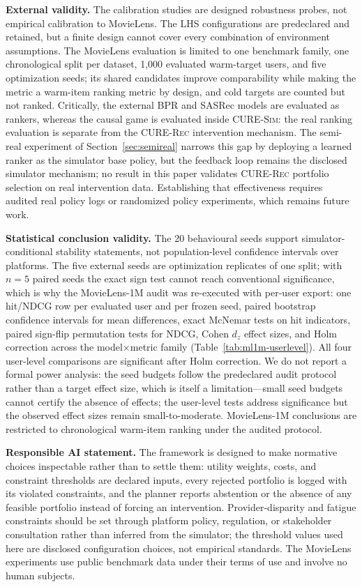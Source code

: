 \documentclass[pdflatex,sn-mathphys-num]{sn-jnl}
\theoremstyle{thmstyleone}
\theoremstyle{thmstyletwo}
\theoremstyle{thmstylethree}
\newcommand{\CURE}{\textsc{CURE-Rec}}
\newcommand{\Sim}{\textsc{CURE-Sim}}
\begin{document}
\textbf{External validity.} The calibration studies are designed robustness probes, not empirical calibration to MovieLens. The LHS configurations are predeclared and retained, but a finite design cannot cover every combination of environment assumptions. The MovieLens evaluation is limited to one benchmark family, one chronological split per dataset, 1,000 evaluated warm-target users, and five optimization seeds; its shared candidates improve comparability while making the metric a warm-item ranking metric by design, and cold targets are counted but not ranked. Critically, the external BPR and SASRec models are evaluated as rankers, whereas the causal game is evaluated inside \Sim{}: the real ranking evaluation is separate from the \CURE{} intervention mechanism. The semi-real experiment of Section~\ref{sec:semireal} narrows this gap by deploying a learned ranker as the simulator base policy, but the feedback loop remains the disclosed simulator mechanism; no result in this paper validates \CURE{} portfolio selection on real intervention data. Establishing that effectiveness requires audited real policy logs or randomized policy experiments, which remains future work.

\textbf{Statistical conclusion validity.} The 20 behavioural seeds support simulator-conditional stability statements, not population-level confidence intervals over platforms. The five external seeds are optimization replicates of one split; with $n=5$ paired seeds the exact sign test cannot reach conventional significance, which is why the MovieLens-1M audit was re-executed with per-user export: one hit/NDCG row per evaluated user and per frozen seed, paired bootstrap confidence intervals for mean differences, exact McNemar tests on hit indicators, paired sign-flip permutation tests for NDCG, Cohen $d_z$ effect sizes, and Holm correction across the model$\times$metric family (Table~\ref{tab:ml1m-userlevel}). All four user-level comparisons are significant after Holm correction. We do not report a formal power analysis: the seed budgets follow the predeclared audit protocol rather than a target effect size, which is itself a limitation---small seed budgets cannot certify the absence of effects; the user-level tests address significance but the observed effect sizes remain small-to-moderate. MovieLens-1M conclusions are restricted to chronological warm-item ranking under the audited protocol.

\textbf{Responsible AI statement.} The framework is designed to make normative choices inspectable rather than to settle them: utility weights, costs, and constraint thresholds are declared inputs, every rejected portfolio is logged with its violated constraints, and the planner reports abstention or the absence of any feasible portfolio instead of forcing an intervention. Provider-disparity and fatigue constraints should be set through platform policy, regulation, or stakeholder consultation rather than inferred from the simulator; the threshold values used here are disclosed configuration choices, not empirical standards. The MovieLens experiments use public benchmark data under their terms of use and involve no human subjects.
\end{document}
